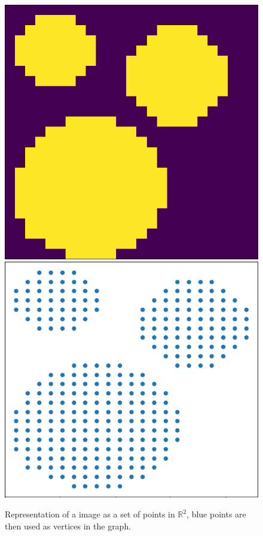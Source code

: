 \documentclass[12pt]{article}
\begin{document}
\begin{figure}[H]
	\centering
	\includegraphics[scale=0.25]{circlepic.png}
	\hspace{2em}
	\includegraphics[scale=0.35]{circlesgraph2.png}
	\caption{Representation of a image as a set of points in $\mathbb{R}^2$, blue points are then used as vertices in the graph.}
\end{figure}
\end{document}

